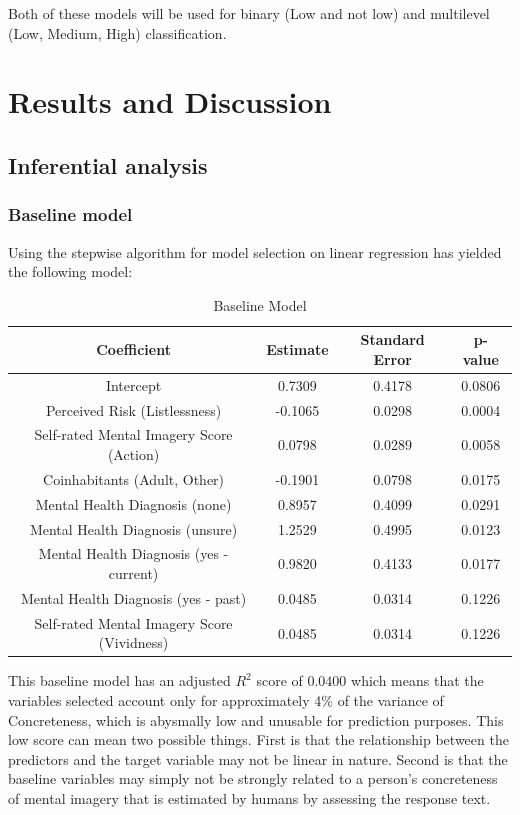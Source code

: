 \documentclass[12pt, a4paper]{article}
\begin{document}
Both of these models will be used for binary (Low and not low) and multilevel (Low, Medium, High) classification.

\section{Results and Discussion}

\subsection{Inferential analysis}

\subsubsection{Baseline model}
Using the stepwise algorithm for model selection on linear regression has yielded the following model:

\begin{table}[ht]
\centering
\begin{tabular}{||c c c c||} 
 \hline
 Coefficient & Estimate & Standard Error & p-value \\ [0.5ex] 
 \hline\hline
 Intercept & 0.7309 & 0.4178 & 0.0806 \\ 
 Perceived Risk (Listlessness) & -0.1065 & 0.0298 & 0.0004 \\
 Self-rated Mental Imagery Score (Action)  & 0.0798 & 0.0289 & 0.0058 \\
 Coinhabitants (Adult, Other)\footnotemark & -0.1901 & 0.0798 & 0.0175 \\
 Mental Health Diagnosis (none) & 0.8957 & 0.4099 & 0.0291 \\ 
Mental Health Diagnosis (unsure) & 1.2529 & 0.4995 & 0.0123 \\
Mental Health Diagnosis (yes - current) & 0.9820 & 0.4133 & 0.0177 \\
Mental Health Diagnosis (yes - past) & 0.0485 & 0.0314 & 0.1226\\
 Self-rated Mental Imagery Score (Vividness)  & 0.0485 & 0.0314 & 0.1226 \\ [1ex] 
 \hline
\end{tabular}
\caption{Baseline Model}
\label{table:1}
\end{table}

This baseline model has an adjusted $R^2$ score of $0.0400$ which means that the variables selected account only for approximately 4\% of the variance of Concreteness, which is abysmally low and unusable for prediction purposes. This low score can  mean two possible things. First is that the relationship between the predictors and the target variable may not be linear in nature. Second is that the baseline variables may simply not be strongly related to a person's concreteness of mental imagery that is estimated by humans by assessing the response text.  
\end{document}
